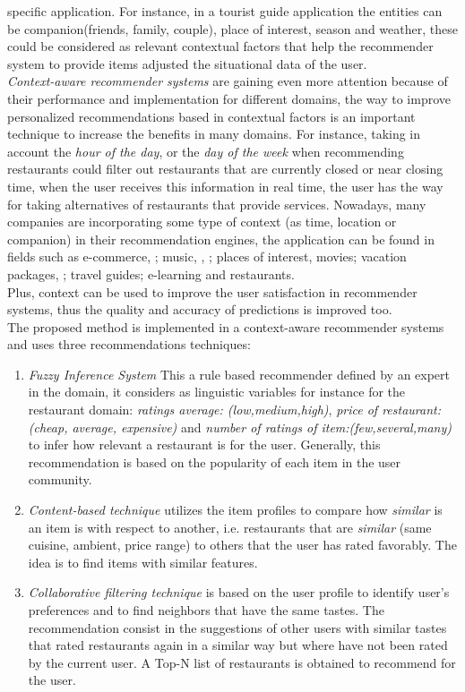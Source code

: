 specific application. For instance, in a
tourist guide application the entities can be companion(friends,
family, couple), place of interest, season and weather, these could be
considered as relevant contextual factors that help the recommender
system to provide items adjusted the situational data of the user.\\
\textit{Context-aware recommender systems} are gaining even more
attention because of their performance and implementation for
different domains, the  way to improve personalized recommendations
based in contextual factors is an important technique to increase the
benefits in  many domains. For instance, taking in account the
\textit{hour of the day},  or the \textit{day of the week} when
recommending restaurants could  filter out restaurants that are
currently closed or near closing time, when the user receives this
information in real time, the user has the  way for taking
alternatives of restaurants that provide services. Nowadays, many
companies are incorporating some type of context (as time, location or
companion) in their recommendation engines,  the application can be
found in fields such as e-commerce\cite{schafer1999recommender},
\cite{bulander2005enabling}; music\cite{ricci2012context}, 
\cite{baltrunas2011incarmusic}, \cite{huq2010automated}; 
places of interest\cite{baltrunas2012context},
movies\cite{eyjolfsdottir2010moviegen}; vacation
packages\cite{liu2011personalized}, \cite{liu2014cocktail}; 
travel guides\cite{savage2012m}; e-learning\cite{ortigosa2010entornos} 
and restaurants\cite{chu2013chinese}.\\
Plus, context can be used to improve the user satisfaction  in
recommender systems, thus the quality and accuracy of predictions  
is improved too.\\
The proposed method is implemented in a context-aware 
recommender systems and uses three recommendations techniques:
\begin{enumerate} 
\item \textit{Fuzzy Inference System} This a rule based recommender
defined by an expert in the domain, it considers as linguistic
variables for instance for the restaurant domain: \textit{ratings
average: (low,medium,high)}, \textit{price of restaurant:(cheap,
average, expensive)} and \textit{number of ratings of
item:(few,several,many)} to infer how relevant a restaurant is for the
user. Generally, this recommendation is based on the popularity of
each item in the user community.
\item \textit{Content-based technique} utilizes the item profiles 
to compare how \textit{similar} is an item is with respect to 
another, i.e. restaurants that are \textit{similar} (same cuisine, 
ambient, price range)  to others that the user has rated favorably. 
The idea is to find items with similar features. 
\item \textit{Collaborative filtering technique} is based on the user
profile to identify user's preferences and to find neighbors that
have the same tastes. The recommendation consist in the suggestions of
other users with similar tastes that rated restaurants again in a
similar way but where have not been rated by the current user. A Top-N
list of restaurants is obtained to recommend for the user.
\end{enumerate} 
